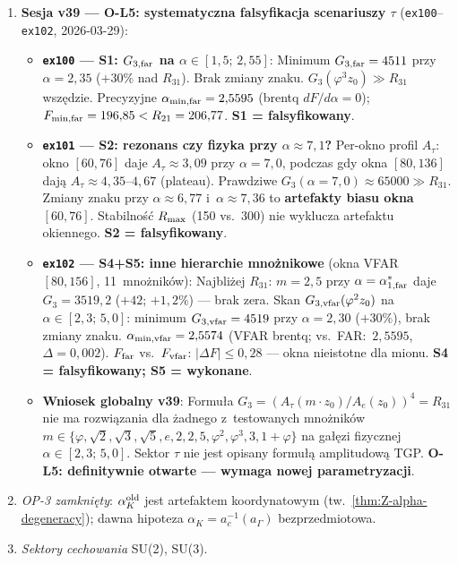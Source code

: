 \begin{remark}
\begin{enumerate}[nosep]
  \item \textbf{Sesja v39 --- O-L5: systematyczna falsyfikacja scenariuszy $\tau$}
    (\texttt{ex100}--\texttt{ex102}, 2026-03-29):
    \begin{itemize}[nosep]
      \item \textbf{\texttt{ex100} --- S1: $G_{3,\rm far}$ na $\alpha\in[1{,}5;\,2{,}55]$}:
        Minimum $G_{3,\rm far}=4511$ przy $\alpha=2{,}35$ ($+30\%$ nad $R_{31}$).
        Brak zmiany znaku. $G_3(\varphi^3 z_0) \gg R_{31}$ wszędzie.
        Precyzyjne $\alpha_{\min,\rm far}=2{,}5595$ (brentq $dF/d\alpha=0$);
        $F_{\min,\rm far}=196{,}85 < R_{21}=206{,}77$.
        \textbf{S1 = falsyfikowany}.
      \item \textbf{\texttt{ex101} --- S2: rezonans czy fizyka przy $\alpha\approx7{,}1$?}
        Per-okno profil $A_\tau$: okno $[60,76]$ daje $A_\tau\approx3{,}09$
        przy $\alpha=7{,}0$, podczas gdy okna $[80,136]$ dają
        $A_\tau\approx4{,}35$--$4{,}67$ (plateau). Prawdziwe
        $G_3(\alpha=7{,}0)\approx65000 \gg R_{31}$.
        Zmiany znaku przy $\alpha\approx6{,}77$ i~$\alpha\approx7{,}36$
        to \textbf{artefakty biasu okna $[60,76]$}.
        Stabilno\'s\'c $R_{\rm max}$ (150 vs.\ 300) nie wyklucza artefaktu okiennego.
        \textbf{S2 = falsyfikowany}.
      \item \textbf{\texttt{ex102} --- S4+S5: inne hierarchie mno\.znikowe}
        (okna VFAR $[80,156]$, 11~mnożników):
        Najbli\.zej $R_{31}$: $m=2{,}5$ przy $\alpha=\alpha^*_{1,\rm far}$
        daje $G_3=3519{,}2$ ($+42$; $+1{,}2\%$) --- brak zera.
        Skan $G_{3,\rm vfar}(\varphi^2 z_0)$ na $\alpha\in[2{,}3;\,5{,}0]$:
        minimum $G_{3,\rm vfar}=4519$ przy $\alpha=2{,}30$ ($+30\%$),
        brak zmiany znaku.
        $\alpha_{\min,\rm vfar}=2{,}5574$ (VFAR brentq; vs.~FAR:~$2{,}5595$, $\Delta=0{,}002$).
        $F_{\rm far}$ vs.\ $F_{\rm vfar}$: $|\Delta F|\le0{,}28$ --- okna nieistotne dla mionu.
        \textbf{S4 = falsyfikowany; S5 = wykonane}.
      \item \textbf{Wniosek globalny v39}:
        Formu\l{}a $G_3=(A_\tau(m\cdot z_0)/A_e(z_0))^4=R_{31}$ nie ma rozwi\k{a}zania
        dla \.zadnego z~testowanych mno\.znik\'ow
        $m\in\{\varphi,\sqrt{2},\sqrt{3},\sqrt{5},e,2,2{,}5,\varphi^2,\varphi^3,3,1{+}\varphi\}$
        na ga\l{}\k{e}zi fizycznej $\alpha\in[2{,}3;\,5{,}0]$.
        Sektor $\tau$ nie jest opisany formu\l{}\k{a} amplitudow\k{a} TGP.
        \textbf{O-L5: definitywnie otwarte --- wymaga nowej parametryzacji}.
    \end{itemize}

  \item \emph{OP-3 zamkni\k{e}ty}: $\alpha_K^{\rm old}$ jest artefaktem
    koordynatowym (tw.~\ref{thm:Z-alpha-degeneracy}); dawna hipoteza
    $\alpha_K = a_c^{-1}(a_\Gamma)$ bezprzedmiotowa.
  \item \emph{Sektory cechowania} SU(2), SU(3).
\end{enumerate}
\end{remark}

